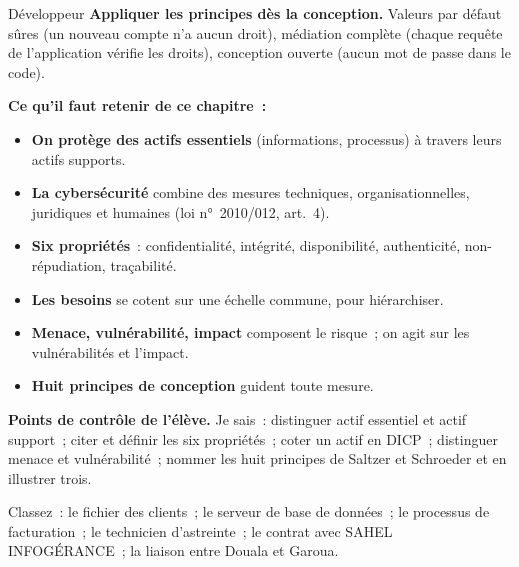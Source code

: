 \begin{boxmetier}{Développeur}
\textbf{Appliquer les principes dès la conception.} Valeurs par défaut
sûres (un nouveau compte n'a aucun droit), médiation complète (chaque
requête de l'application vérifie les droits), conception ouverte (aucun
mot de passe dans le code).
\end{boxmetier}

\separateur

\begin{boxresume}
\textbf{Ce qu'il faut retenir de ce chapitre~:}
\begin{itemize}
    \item \textbf{On protège des actifs essentiels} (informations,
          processus) à travers leurs actifs supports.
    \item \textbf{La cybersécurité} combine des mesures techniques,
          organisationnelles, juridiques et humaines (loi n°~2010/012,
          art.~4).
    \item \textbf{Six propriétés}~: confidentialité, intégrité,
          disponibilité, authenticité, non-répudiation, traçabilité.
    \item \textbf{Les besoins} se cotent sur une échelle commune, pour
          hiérarchiser.
    \item \textbf{Menace, vulnérabilité, impact} composent le risque~; on
          agit sur les vulnérabilités et l'impact.
    \item \textbf{Huit principes de conception} guident toute mesure.
\end{itemize}
\end{boxresume}

\begin{boxinfo}
\textbf{Points de contrôle de l'élève.} Je sais~: distinguer actif
essentiel et actif support~; citer et définir les six propriétés~; coter
un actif en DICP~; distinguer menace et vulnérabilité~; nommer les huit
principes de Saltzer et Schroeder et en illustrer trois.
\end{boxinfo}

\bigskip

\begin{boxexo}[title={\ding{45}\quad Exercice~1.1. Essentiel ou support~? \niveaubase}]
Classez~: le fichier des clients~; le serveur de base de données~; le
processus de facturation~; le technicien d'astreinte~; le contrat avec
SAHEL INFOGÉRANCE~; la liaison entre Douala et Garoua.
\end{boxexo}

